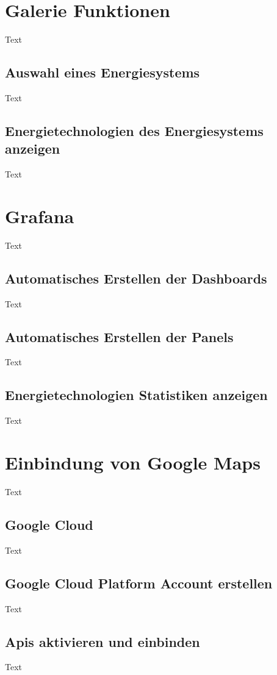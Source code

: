 \section{Galerie Funktionen}
Text
\subsection{Auswahl eines Energiesystems}
Text
\subsection{Energietechnologien des Energiesystems anzeigen}
Text



\section{Grafana}
Text

\subsection{Automatisches Erstellen der Dashboards}
Text

\subsection{Automatisches Erstellen der Panels}
Text

\subsection{Energietechnologien Statistiken anzeigen}
Text



\section{Einbindung von Google Maps}
Text

\subsection{Google Cloud}
Text

\subsection{Google Cloud Platform Account erstellen}
Text

\subsection{Apis aktivieren und einbinden}
Text

